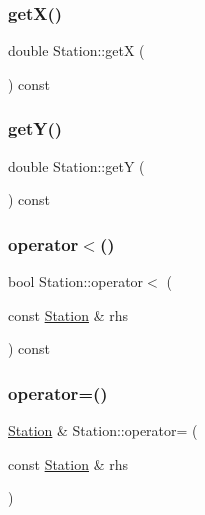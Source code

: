 \mbox{\label{class_station_aa954dcd5d8f77ac9b91021b1e9c07735}} 
\subsubsection{\texorpdfstring{get\+X()}{getX()}}
{\footnotesize\ttfamily double Station\+::getX (\begin{DoxyParamCaption}{ }\end{DoxyParamCaption}) const}

\mbox{\label{class_station_aadddb2db193456d14bae16dbf2b8259f}} 
\subsubsection{\texorpdfstring{get\+Y()}{getY()}}
{\footnotesize\ttfamily double Station\+::getY (\begin{DoxyParamCaption}{ }\end{DoxyParamCaption}) const}

\mbox{\label{class_station_ad49b12012cb13c9f806587d9aa4c6fc9}} 
\subsubsection{\texorpdfstring{operator$<$()}{operator<()}}
{\footnotesize\ttfamily bool Station\+::operator$<$ (\begin{DoxyParamCaption}\item[{const \mbox{\hyperlink{class_station}{Station}} \&}]{rhs }\end{DoxyParamCaption}) const}

\mbox{\label{class_station_abaf887b87628c2bcd7e0af8626a4a1a4}} 
\subsubsection{\texorpdfstring{operator=()}{operator=()}}
{\footnotesize\ttfamily \mbox{\hyperlink{class_station}{Station}} \& Station\+::operator= (\begin{DoxyParamCaption}\item[{const \mbox{\hyperlink{class_station}{Station}} \&}]{rhs }\end{DoxyParamCaption})}

